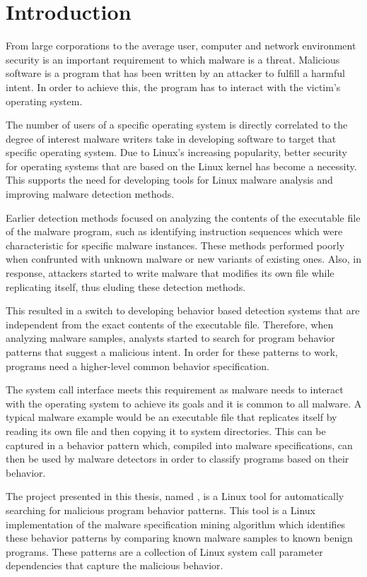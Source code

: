 \chapter{Introduction}
\label{chapter:intro}

From large corporations to the average user, computer and network environment security is an important requirement to which malware is a threat. Malicious software is a program that has been written by an attacker to fulfill a harmful intent. In order to achieve this, the program has to interact with the victim's operating system.

The number of users of a specific operating system is directly correlated to the degree of interest malware writers take in developing software to target that specific operating system. Due to Linux's increasing popularity, better security for operating systems that are based on the Linux kernel has become a necessity. This supports the need for developing tools for Linux malware analysis and improving malware detection methods.

Earlier detection methods focused on analyzing the contents of the executable file of the malware program, such as identifying instruction sequences which were characteristic for specific malware instances. These methods performed poorly when confrunted with unknown malware or new variants of existing ones. Also, in response, attackers started to write malware that modifies its own file while replicating itself, thus eluding these detection methods.

This resulted in a switch to developing behavior based detection systems that are independent from the exact contents of the executable file. Therefore, when analyzing malware samples, analysts started to search for program behavior patterns that suggest a malicious intent. In order for these patterns to work, programs need a higher-level common behavior specification.

The system call interface meets this requirement as malware needs to interact with the operating system to achieve its goals and it is common to all malware. A typical malware example would be an executable file that replicates itself by reading its own file and then copying it to system directories. This can be captured in a behavior pattern which, compiled into malware specifications, can then be used by malware detectors in order to classify programs based on their behavior.

The project presented in this thesis, named \textbf{\project}, is a Linux tool for automatically searching for malicious program behavior patterns. This tool is a Linux implementation of the malware specification mining algorithm which identifies these behavior patterns by comparing known malware samples to known benign programs. These patterns are a collection of Linux system call parameter dependencies that capture the malicious behavior.

